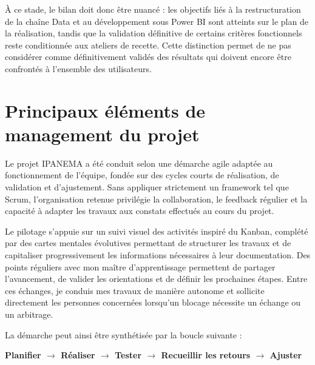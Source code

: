 À ce stade, le bilan doit donc être nuancé : les objectifs liés à la restructuration de la 
chaîne Data et au développement sous Power BI sont atteints sur le plan de la réalisation, 
tandis que la validation définitive de certains critères fonctionnels reste conditionnée aux 
ateliers de recette. Cette distinction permet de ne pas considérer comme définitivement validés 
des résultats qui doivent encore être confrontés à l'ensemble des utilisateurs. 

\section{Principaux éléments de management du projet}

Le projet IPANEMA a été conduit selon une démarche agile adaptée au fonctionnement 
de l'équipe, fondée sur des cycles courts de réalisation, de validation et d'ajustement. Sans 
appliquer strictement un framework tel que Scrum, l'organisation retenue privilégie la 
collaboration, le feedback régulier et la capacité à adapter les travaux aux constats effectués 
au cours du projet.

Le pilotage s'appuie sur un suivi visuel des activités inspiré du Kanban, complété par 
des cartes mentales évolutives permettant de structurer les travaux et de capitaliser 
progressivement les informations nécessaires à leur documentation. Des points réguliers avec 
mon maître d'apprentissage permettent de partager l'avancement, de valider les orientations 
et de définir les prochaines étapes. Entre ces échanges, je conduis mes travaux de manière autonome et sollicite directement les personnes concernées lorsqu'un blocage nécessite un 
échange ou un arbitrage. 

La démarche peut ainsi être synthétisée par la boucle suivante :

\begin{center}
\begin{tcolorbox}[
    colframe=gray!60,       %
    colback=gray!4!white,   %
    boxrule=0.8pt,          %
    arc=5pt,                %
    width=\textwidth,       %
    halign=center,          %
    top=8pt, bottom=8pt
]
\small\bfseries
Planifier 
\;\textcolor{gray!80}{$\longrightarrow$}\; 
Réaliser 
\;\textcolor{gray!80}{$\longrightarrow$}\; 
Tester 
\;\textcolor{gray!80}{$\longrightarrow$}\; 
Recueillir les retours 
\;\textcolor{gray!80}{$\longrightarrow$}\; 
Ajuster
\end{tcolorbox}
\end{center}


